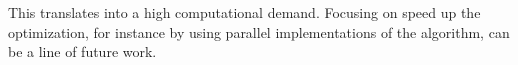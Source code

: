 {%
%

%



This translates into a high computational demand. Focusing on speed up the optimization, for instance by using parallel implementations of the algorithm, can be a line of future work.


\newpage

}
